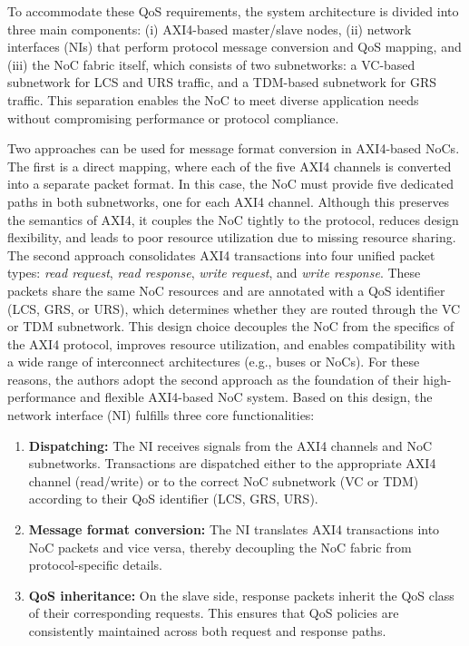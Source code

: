 To accommodate these QoS requirements, the system architecture is divided into three main components: (i) AXI4-based master/slave nodes, (ii) network interfaces (NIs) that perform protocol message conversion and QoS mapping, and (iii) the NoC fabric itself, which consists of two subnetworks: a VC-based subnetwork for LCS and URS traffic, and a TDM-based subnetwork for GRS traffic. 
This separation enables the NoC to meet diverse application needs without compromising performance or protocol compliance.


Two approaches can be used for message format conversion in AXI4-based NoCs. The first is a direct mapping, where each of the five AXI4 channels is converted into a separate packet format. In this case, the NoC must provide five dedicated paths in both subnetworks, one for each AXI4 channel. Although this preserves the semantics of AXI4, it couples the NoC tightly to the protocol, reduces design flexibility, and leads to poor resource utilization due to missing resource sharing. 
The second approach consolidates AXI4 transactions into four unified packet types: \textit{read request}, \textit{read response}, \textit{write request}, and \textit{write response}. These packets share the same NoC resources and are annotated with a QoS identifier (LCS, GRS, or URS), which determines whether they are routed through the VC or TDM subnetwork. This design choice decouples the NoC from the specifics of the AXI4 protocol, improves resource utilization, and enables compatibility with a wide range of interconnect architectures (e.g., buses or NoCs).
For these reasons, the authors adopt the second approach as the foundation of their high-performance and flexible AXI4-based NoC system. Based on this design, the network interface (NI) fulfills three core functionalities:
\begin{enumerate}
    \item \textbf{Dispatching:} The NI receives signals from the AXI4 channels and NoC subnetworks. 
    Transactions are dispatched either to the appropriate AXI4 channel (read/write) or to the correct NoC subnetwork (VC or TDM) according to their QoS identifier (LCS, GRS, URS).
    \item \textbf{Message format conversion:} The NI translates AXI4 transactions into NoC packets and vice versa, thereby decoupling the NoC fabric from protocol-specific details.
    \item \textbf{QoS inheritance:} On the slave side, response packets inherit the QoS class of their corresponding requests. 
    This ensures that QoS policies are consistently maintained across both request and response paths.
\end{enumerate}

